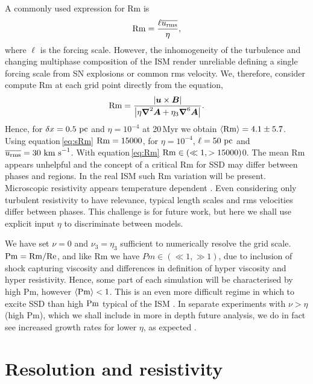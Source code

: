\documentclass[preprint2]{aastex63}
\newcommand\Rm{{\rm Rm} }
\newcommand\Rey{{\rm Re} }
\newcommand\Pm{{\rm Pm} }
\newcommand{\vect}[1]{{{\mbox{\boldmath $#1$}}}}%
\newcommand\pc{~ {\rm pc}}
\newcommand\dx{ {\delta x}}
\newcommand\kms{~ {\rm km~ s}^{-1}}
\begin{document}
 A commonly used expression for Rm is 
 \begin{equation}\label{eq:sRm}
 \Rm=\frac{\ell \overline{u_{\rm rms}}}{\eta},
 \end{equation}
 where $\ell$ is the forcing scale.
 However, the inhomogeneity of the turbulence and changing multiphase
 composition of the ISM render unreliable defining a single forcing scale from
 SN explosions or common rms velocity.
 We, therefore, consider compute Rm at each grid point directly from the
 equation,
 \begin{eqnarray}\label{eq:Rm}
   \Rm = \frac{\left|\vect{u}\times\vect{B}\right|}{
     \left|\eta\vect\nabla^2\vect{A}+\eta_3\vect\nabla^6\vect{A}\right|}.
 \end{eqnarray}
 Hence, for $\dx=0.5\pc$ and $\eta=10^{-4}$ at 20\,Myr we obtain 
 $\langle\Rm\rangle=4.1\pm5.7$.
 Using equation\,\eqref{eq:sRm} 
 $\Rm = 15000$, for $\eta=10^{-4}$, $\ell=50\pc$ and
 $\overline{u_{\rm rms}}=30\kms$.
 With equation\,\eqref{eq:Rm} $\Rm\in(\ll1,>15000)$0.
 The mean Rm appears unhelpful and the concept of a critical Rm for SSD may
 differ between phases and regions.
 In the real ISM such Rm variation will be present.
 Microscopic resistivity appears temperature dependent \citep{CSR50}.
 Even considering only turbulent resistivity to have relevance, 
 typical length scales and rms velocities differ between phases.
 This challenge is for future work, but here we shall use explicit input $\eta$
 to discriminate between models.


 We have set $\nu=0$ and $\nu_3=\eta_3$ sufficient to numerically resolve the
 grid scale.
 $\Pm = \Rm/\Rey$, and like Rm we have $Pm\in(\ll1,\gg1)$, due
 to inclusion of shock capturing viscosity and differences in
 definition of hyper viscosity and hyper resistivity.
 Hence, some part of each simulation will be characterised by high Pm,
 however $\langle\Pm\rangle<1$.
 This is an even more difficult regime in which to excite SSD than high $\Pm$
 typical of the ISM \citep{HBD04}.
 In separate experiments with $\nu>\eta$ (high Pm), which we shall include in
 more in depth future analysis, we do in fact see increased growth rates for
 lower $\eta$, as expected \citep{Sch07}.
%
\section{Resolution and resistivity} \label{sec:results}
\end{document}
